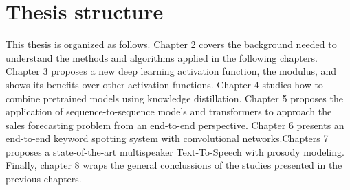\section{Thesis structure}
This thesis is organized as follows. Chapter 2 covers the background needed to understand the methods and algorithms applied in the following chapters. Chapter 3 proposes a new deep learning activation function, the modulus, and shows its benefits over other activation functions. Chapter 4 studies how to combine pretrained models using knowledge distillation. Chapter 5 proposes the application of sequence-to-sequence models and transformers to approach the sales forecasting problem from an end-to-end perspective. Chapter 6 presents an end-to-end keyword spotting system with convolutional networks.Chapters 7 proposes a state-of-the-art multispeaker Text-To-Speech with prosody modeling. Finally, chapter 8 wraps the general conclussions of the studies presented in the previous chapters.



